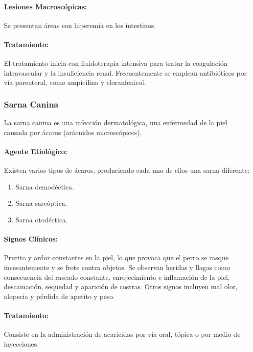             \paragraph{Lesiones Macroscópicas:} Se presentan áreas con hiperemia en los intestinos.

            \paragraph{Tratamiento:} El tratamiento inicia con fluidoterapia intensiva para tratar la coagulación intravascular y la insuficiencia renal. Frecuentemente se emplean antibióticos por vía parenteral, como ampicilina y cloranfenicol. 

        \subsubsection{Sarna Canina}

            La sarna canina es una infección dermatológica, una enfermedad de la piel causada por ácaros (arácnidos microscópicos).

            \paragraph{Agente Etiológico:} Existen varios tipos de ácaros, produciendo cada uno de ellos una sarna diferente:

            \begin{enumerate}
                \item Sarna demodéctica.
                \item Sarna sarcóptica.
                \item Sarna otodéctica.
            \end{enumerate}

            \paragraph{Signos Clínicos:} Prurito y ardor constantes en la piel, lo que provoca que el perro se rasque incesantemente y se frote contra objetos. Se observan heridas y llagas como consecuencia del rascado constante, enrojecimiento e inflamación de la piel, descamación, sequedad y aparición de costras. Otros signos incluyen mal olor, alopecia y pérdida de apetito y peso. 

            \paragraph{Tratamiento:} Consiste en la administración de acaricidas por vía oral, tópica o por medio de inyecciones.

